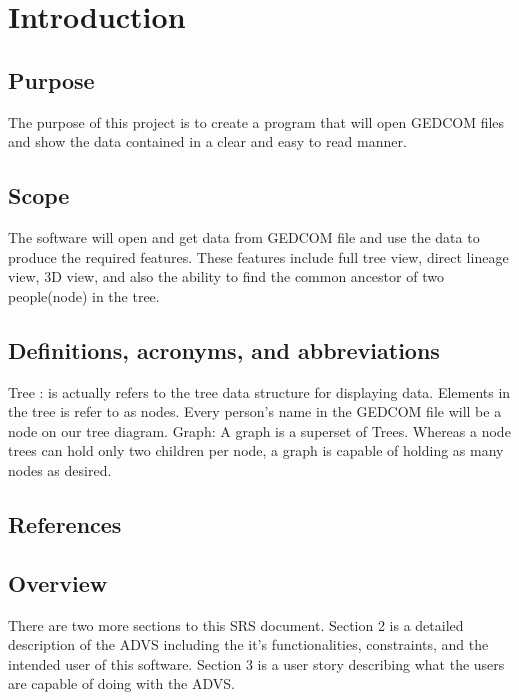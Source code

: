 \documentclass[onecolumn, draftclsnofoot, 10pt, compsoc]{IEEEtran}
\begin{document}
\section{Introduction}
\subsection{Purpose}
\begin{singlespace}
The purpose of this project is to create a program that will open GEDCOM files and show the data contained in a clear and easy to read manner.
\end{singlespace}

\subsection{Scope}
\begin{singlespace}
The software will open and get data from GEDCOM file and use the data to produce the required features. These features include full tree view, direct lineage view, 3D view, and also the ability to find the common ancestor of two people(node) in the tree. 
\end{singlespace}

\subsection{Definitions, acronyms, and abbreviations}
\begin{singlespace}
Tree : is actually refers to the tree data structure for displaying data. Elements in the tree is refer to as nodes. Every person's name in the GEDCOM file will be a node on our tree diagram.
\newline
\newline
Graph: A graph is a superset of Trees. Whereas a node trees can hold only two children per node, a graph is capable of holding as many nodes as desired.
\end{singlespace}

\subsection{References}
\begin{singlespace}

\end{singlespace}

\subsection{Overview}
\begin{singlespace}
	There are two more sections to this SRS document. Section 2 is a detailed description of the ADVS including the it's functionalities, constraints, and the intended user of this software. Section 3 is a user story describing what the users are capable of doing with the ADVS.
\end{singlespace}
\end{document}
